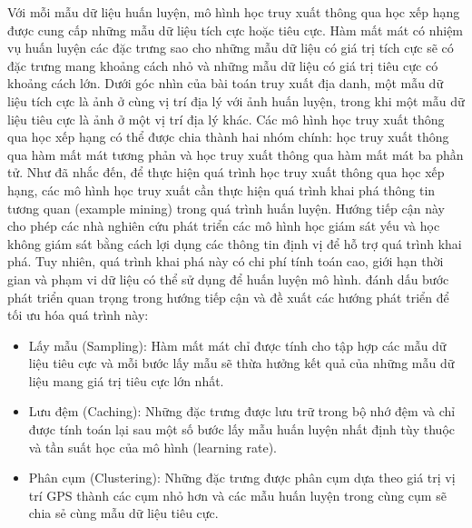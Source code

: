 Với mỗi mẫu dữ liệu huấn luyện, mô hình học truy xuất thông qua học xếp hạng được cung cấp những mẫu dữ liệu tích cực hoặc tiêu cực. Hàm mất mát có nhiệm vụ huấn luyện các đặc trưng sao cho những mẫu dữ liệu có giá trị tích cực sẽ có đặc trưng mang khoảng cách nhỏ và những mẫu dữ liệu có giá trị tiêu cực có khoảng cách lớn. Dưới góc nhìn của bài toán truy xuất địa danh, một mẫu dữ liệu tích cực là ảnh ở cùng vị trí địa lý với ảnh huấn luyện, trong khi một mẫu dữ liệu tiêu cực là ảnh ở một vị trí địa lý khác. Các mô hình học truy xuất thông qua học xếp hạng có thể được chia thành hai nhóm chính: học truy xuất thông qua hàm mất mát tương phản và học truy xuất thông qua hàm mất mát ba phần tử. Như đã nhắc đến, để thực hiện quá trình học truy xuất thông qua học xếp hạng, các mô hình học truy xuất cần thực hiện quá trình khai phá thông tin tương quan (example mining) trong quá trình huấn luyện. Hướng tiếp cận này cho phép các nhà nghiên cứu phát triển các mô hình học giám sát yếu \cite{arandjelovic2016netvlad, jin2017learned} và học không giám sát \cite{radenovic2018fine} bằng cách lợi dụng các thông tin định vị để hỗ trợ quá trình khai phá. Tuy nhiên, quá trình khai phá này có chi phí tính toán cao, giới hạn thời gian và phạm vi dữ liệu có thể sử dụng để huấn luyện mô hình. \cite{arandjelovic2016netvlad} đánh dấu bước phát triển quan trọng trong hướng tiếp cận và đề xuất các hướng phát triển để tối ưu hóa quá trình này:

\begin{itemize}
    \item Lấy mẫu (Sampling): Hàm mất mát chỉ được tính cho tập hợp các mẫu dữ liệu tiêu cực và mỗi bước lấy mẫu sẽ thừa hưởng kết quả của những mẫu dữ liệu mang giá trị tiêu cực lớn nhất.
    \item Lưu đệm (Caching): Những đặc trưng được lưu trữ trong bộ nhớ đệm và chỉ được tính toán lại sau một số bước lấy mẫu huấn luyện nhất định tùy thuộc và tần suất học của mô hình (learning rate).
    \item Phân cụm (Clustering): Những đặc trưng được phân cụm dựa theo giá trị vị trí GPS thành các cụm nhỏ hơn và các mẫu huấn luyện trong cùng cụm sẽ chia sẻ cùng mẫu dữ liệu tiêu cực.
\end{itemize}
